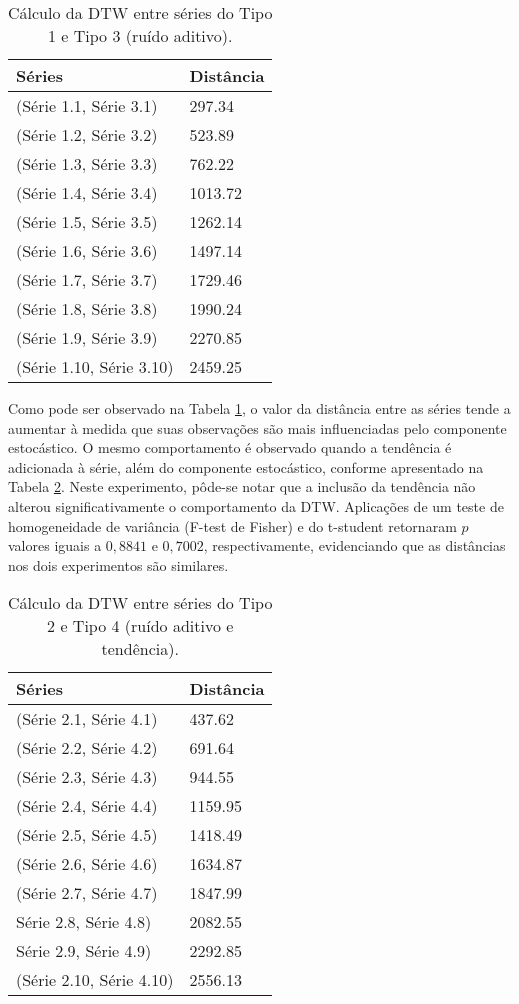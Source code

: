 \begin{table}[!ht]
\centering
\caption{Cálculo da DTW entre séries do Tipo 1 e Tipo 3 (ruído aditivo).}
\begin{tabular}{ll}
  \hline
 Séries & Distância  \\
  \hline
  \hline
(Série 1.1, Série 3.1) & 297.34 \\
(Série 1.2, Série 3.2)& 523.89 \\
(Série 1.3, Série 3.3) & 762.22 \\
(Série 1.4, Série 3.4) & 1013.72 \\
(Série 1.5, Série 3.5) & 1262.14\\
(Série 1.6, Série 3.6) & 1497.14\\
(Série 1.7, Série 3.7) & 1729.46 \\
(Série 1.8, Série 3.8) & 1990.24\\
(Série 1.9, Série 3.9) & 2270.85\\
(Série 1.10, Série 3.10) & 2459.25 \\
\hline
\end{tabular}
\label{dtw}
\end{table}

Como pode ser observado na Tabela \ref{dtw}, o valor da distância entre as séries tende a aumentar à medida que suas observações são mais influenciadas pelo componente estocástico. O mesmo comportamento é observado quando a tendência é adicionada à série, além do componente estocástico, conforme apresentado na Tabela \ref{dtw2}. Neste experimento, pôde-se notar que a inclusão da tendência não alterou significativamente o comportamento da DTW. Aplicações de um teste de homogeneidade de variância (F-test de Fisher) e do t-student retornaram $p$ valores iguais a $0,8841$ e $0,7002$, respectivamente, evidenciando que as distâncias nos dois experimentos são similares.

\begin{table}[!ht]
\centering
\caption{Cálculo da DTW entre séries do Tipo 2 e Tipo 4 (ruído aditivo e tendência).}
\begin{tabular}{ll}
 \hline
Séries & Distância \\
 \hline
 \hline
(Série 2.1, Série 4.1) & 437.62 \\ 
(Série 2.2, Série 4.2) & 691.64 \\ 
(Série 2.3, Série 4.3) & 944.55 \\ 
(Série 2.4, Série 4.4) & 1159.95 \\
(Série 2.5, Série 4.5) & 1418.49 \\ 
(Série 2.6, Série 4.6) & 1634.87 \\ 
(Série 2.7, Série 4.7) & 1847.99 \\ 
Série 2.8, Série 4.8) & 2082.55 \\ 
Série 2.9, Série 4.9) & 2292.85 \\ 
(Série 2.10, Série 4.10) & 2556.13 \\
  \hline
\end{tabular}
\label{dtw2}
\end{table}

